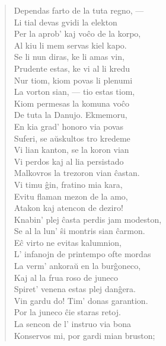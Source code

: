 \begin{verse}
                Dependas farto de la tuta regno, ---\\
                Li tial devas gvidi la elekton\\
                Per la aprob' kaj vo\^co de la korpo,\\
                Al kiu li mem servas kiel kapo.\\
                Se li nun diras, ke li amas vin,\\
                Prudente estas, ke vi al li kredu\\
                Nur tiom, kiom povas li plenumi\\
                La vorton sian, --- tio estas tiom,\\
                Kiom permesas la komuna vo\^co\\
                De tuta la Danujo. Ekmemoru,\\
                En kia grad' honoro via povas\\
                Suferi, se a\u uskultos tro kredeme\\
                Vi lian kanton, se la koron vian\\
                Vi perdos kaj al lia persistado\\
                Malkovros la trezoron vian \^castan.\\
                Vi timu \^gin, fratino mia kara,\\
                Evitu flaman mezon de la amo,\\
                Atakon kaj atencon de deziro!\\
                Knabin' plej \^casta perdis jam modeston,\\
                Se al la lun' \^si montris sian \^carmon.\\
                E\^c virto ne evitas kalumnion,\\
                L' infanojn de printempo ofte mordas\\
                La verm' ankora\u u en la bur\^goneco,\\
                Kaj al la frua roso de juneco\\
                Spiret' venena estas plej dan\^gera.\\
                Vin gardu do! Tim' donas garantion.\\
                Por la juneco \^cie staras retoj.\\
 La sencon de l' instruo via bona\\
                Konservos mi, por gardi mian bruston;\\

\end{verse}
